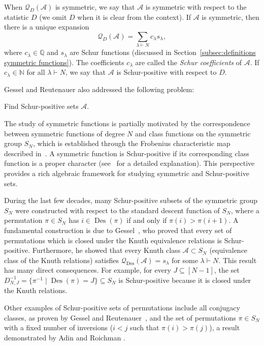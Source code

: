 \documentclass[ALCO]{cedram}
\newcommand{\Des}{\operatorname{Des}}
\newcommand{\NN}{\mathbb{N}}
\newcommand{\QQ}{\mathbb{Q}}
\newcommand{\Q}{\mathcal{Q}}
\newcommand{\A}{\mathcal{A}}
\begin{document}
When $\Q_{D}(\A)$ is symmetric, we say that $\A$ is symmetric with respect to the statistic $D$ (we omit $D$ when it is clear from the context). If $\A$ is symmetric, then there is a unique expansion
\[
    \Q_{D} (\A) = \sum_{\lambda \vdash N} c_\lambda s_\lambda,
\]
where $c_\lambda \in \QQ$ and $s_\lambda$ are Schur functions (discussed in Section~\ref{subsec:definitions symmetric functions}). The coefficients $c_\lambda$ are called the \emph{Schur coefficients} of $\A$.
If $c_\lambda \in \NN$ for all $\lambda \vdash N$, we say that $\A$ is Schur-positive with respect to $D$.

Gessel and Reutenauer also addressed the following problem:
\begin{problem}
    Find Schur-positive sets $\A$.
\end{problem}






The study of symmetric functions is partially motivated by the correspondence between symmetric functions of degree $N$ and class functions on the symmetric group $S_N$, which is established through the Frobenius characteristic map described in~\cite[Chapter 4.7]{sagan_book}. A symmetric function is Schur-positive if its corresponding class function is a proper character (see~\cite{adin_roichman_fine_set} for a detailed explanation). This perspective provides a rich algebraic framework for studying symmetric and Schur-positive sets.

During the last few decades, many Schur-positive subsets of the symmetric group $S_N$ were constructed with respect to the standard descent function of $S_N$, where a permutation $\pi \in S_N$ has $i \in \Des(\pi)$ if and only if $\pi(i) > \pi(i+1)$. A fundamental construction is due to Gessel~\cite{knuth_classes_schur_positive}, who proved that every set of permutations which is closed under the Knuth equivalence relations is Schur-positive. Furthermore, he showed that every Knuth class $\A \subset S_N$ (\ie equivalence class of the Knuth relations) satisfies $\Q_{\Des}(\A) = s_\lambda$ for some $\lambda \vdash N$. This result has many direct consequences. For example, for every $J \subseteq [N-1]$, the set $D_{N,J}^{-1} = \{ \pi^{-1} \mid \Des(\pi)=J\} \subseteq S_N$ is Schur-positive because it is closed under the Knuth relations.

Other examples of Schur-positive sets of permutations include all conjugacy classes, as proven by Gessel and Reutenauer~\cite{gessel1993counting}, and the set of permutations $\pi \in S_N$ with a fixed number of inversions (\ie $i<j$ such that $\pi(i) > \pi(j)$), a result demonstrated by Adin and Roichman \cite[Prop.\ 9.5]{adin_roichman_fine_set}.
\end{document}
